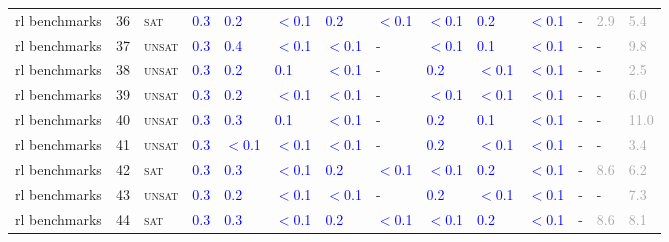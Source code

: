 \begin{center}
{\begin{longtable}{@{}llllllllllllll@{}}
rl benchmarks & 36 & \textsc{sat} & \textcolor{blue}{0.3} & \textcolor{blue}{0.2} & \textcolor{blue}{$<$0.1} & \textcolor{blue}{0.2} & \textcolor{blue}{$<$0.1} & \textcolor{blue}{$<$0.1} & \textcolor{blue}{0.2} & \textcolor{blue}{$<$0.1} & - & \textcolor{darkgray}{2.9} & \textcolor{darkgray}{5.4} \\
rl benchmarks & 37 & \textsc{unsat} & \textcolor{blue}{0.3} & \textcolor{blue}{0.4} & \textcolor{blue}{$<$0.1} & \textcolor{blue}{$<$0.1} & - & \textcolor{blue}{$<$0.1} & \textcolor{blue}{0.1} & \textcolor{blue}{$<$0.1} & - & - & \textcolor{darkgray}{9.8} \\
rl benchmarks & 38 & \textsc{unsat} & \textcolor{blue}{0.3} & \textcolor{blue}{0.2} & \textcolor{blue}{0.1} & \textcolor{blue}{$<$0.1} & - & \textcolor{blue}{0.2} & \textcolor{blue}{$<$0.1} & \textcolor{blue}{$<$0.1} & - & - & \textcolor{darkgray}{2.5} \\
rl benchmarks & 39 & \textsc{unsat} & \textcolor{blue}{0.3} & \textcolor{blue}{0.2} & \textcolor{blue}{$<$0.1} & \textcolor{blue}{$<$0.1} & - & \textcolor{blue}{$<$0.1} & \textcolor{blue}{$<$0.1} & \textcolor{blue}{$<$0.1} & - & - & \textcolor{darkgray}{6.0} \\
rl benchmarks & 40 & \textsc{unsat} & \textcolor{blue}{0.3} & \textcolor{blue}{0.3} & \textcolor{blue}{0.1} & \textcolor{blue}{$<$0.1} & - & \textcolor{blue}{0.2} & \textcolor{blue}{0.1} & \textcolor{blue}{$<$0.1} & - & - & \textcolor{darkgray}{11.0} \\
rl benchmarks & 41 & \textsc{unsat} & \textcolor{blue}{0.3} & \textcolor{blue}{$<$0.1} & \textcolor{blue}{$<$0.1} & \textcolor{blue}{$<$0.1} & - & \textcolor{blue}{0.2} & \textcolor{blue}{$<$0.1} & \textcolor{blue}{$<$0.1} & - & - & \textcolor{darkgray}{3.4} \\
rl benchmarks & 42 & \textsc{sat} & \textcolor{blue}{0.3} & \textcolor{blue}{0.3} & \textcolor{blue}{$<$0.1} & \textcolor{blue}{0.2} & \textcolor{blue}{$<$0.1} & \textcolor{blue}{$<$0.1} & \textcolor{blue}{0.2} & \textcolor{blue}{$<$0.1} & - & \textcolor{darkgray}{8.6} & \textcolor{darkgray}{6.2} \\
rl benchmarks & 43 & \textsc{unsat} & \textcolor{blue}{0.3} & \textcolor{blue}{0.2} & \textcolor{blue}{$<$0.1} & \textcolor{blue}{$<$0.1} & - & \textcolor{blue}{0.2} & \textcolor{blue}{$<$0.1} & \textcolor{blue}{$<$0.1} & - & - & \textcolor{darkgray}{7.3} \\
rl benchmarks & 44 & \textsc{sat} & \textcolor{blue}{0.3} & \textcolor{blue}{0.3} & \textcolor{blue}{$<$0.1} & \textcolor{blue}{0.2} & \textcolor{blue}{$<$0.1} & \textcolor{blue}{$<$0.1} & \textcolor{blue}{0.2} & \textcolor{blue}{$<$0.1} & - & \textcolor{darkgray}{8.6} & \textcolor{darkgray}{8.1} \\

\end{longtable}}
\end{center}
